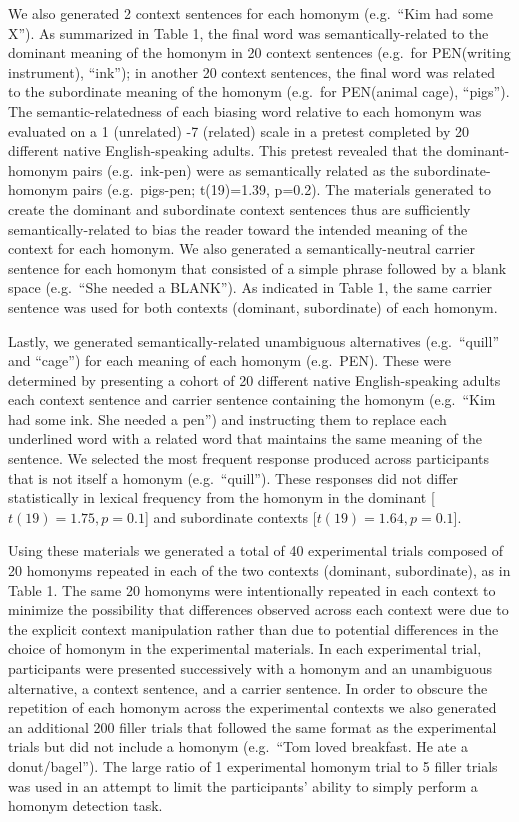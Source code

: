 \documentclass[final,authoryear,5p,times,twocolumn]{elsarticle}
\begin{document}
We also generated 2 context sentences for each homonym (e.g.\ “Kim had some X”).  As summarized in Table 1, the final word was semantically-related to the dominant meaning of the homonym in 20 context sentences (e.g.\ for PEN(writing instrument), “ink”); in another 20 context sentences, the final word was related to the subordinate meaning of the homonym (e.g.\ for PEN(animal cage), “pigs”).   The semantic-relatedness of each biasing word relative to each homonym was evaluated on a 1 (unrelated) -7 (related) scale in a pretest completed by 20 different native English-speaking adults.  This pretest revealed that the dominant-homonym pairs (e.g.\ ink-pen) were as semantically related as the subordinate-homonym pairs (e.g.\ pigs-pen; t(19)=1.39, p=0.2).   The materials generated to create the dominant and subordinate context sentences thus are sufficiently semantically-related to bias the reader toward the intended meaning of the context for each homonym.  We also generated a semantically-neutral carrier sentence for each homonym that consisted of a simple phrase followed by a blank space (e.g.\ “She needed a BLANK”).  As indicated in Table 1, the same carrier sentence was used for both contexts (dominant, subordinate) of each homonym. 

Lastly, we generated semantically-related unambiguous alternatives (e.g.\ “quill” and “cage”) for each meaning of each homonym (e.g.\ PEN).  These were determined by presenting a cohort of 20 different native English-speaking adults each context sentence and carrier sentence containing the homonym (e.g.\ “Kim had some ink. She needed a pen”) and instructing them to replace each underlined word with a related word that maintains the same meaning of the sentence.  We selected the most frequent response produced across participants that is not itself a homonym (e.g.\ “quill”).  These responses did not differ statistically in lexical frequency \cite{Francis1982} from the homonym in the dominant [$t(19)=1.75, p=0.1$] and subordinate contexts [$t(19)=1.64, p=0.1$]. 

Using these materials we generated a total of 40 experimental trials composed of 20 homonyms repeated in each of the two contexts (dominant, subordinate), as in Table 1.  The same 20 homonyms were intentionally repeated in each context to minimize the possibility that differences observed across each context were due to the explicit context manipulation rather than due to potential differences in the choice of homonym in the experimental materials.  In each experimental trial, participants were presented successively with a homonym and an unambiguous alternative, a context sentence, and a carrier sentence. 
In order to obscure the repetition of each homonym across the experimental contexts we also generated an additional 200 filler trials that followed the same format as the experimental trials but did not include a homonym (e.g.\ “Tom loved breakfast. He ate a donut/bagel”).  The large ratio of 1 experimental homonym trial to 5 filler trials was used in an attempt to limit the participants’ ability to simply perform a homonym detection task.
\end{document}

